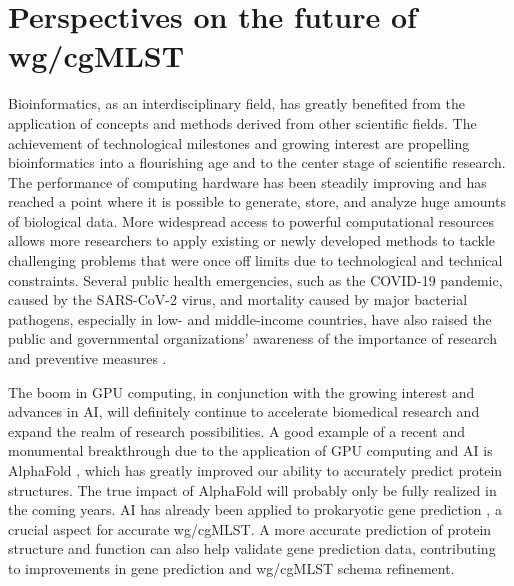 \section{Perspectives on the future of wg/cgMLST}

Bioinformatics, as an interdisciplinary field, has greatly benefited from the application of concepts and methods derived from other scientific fields. The achievement of technological milestones and growing interest are propelling bioinformatics into a flourishing age and to the center stage of scientific research. The performance of computing hardware has been steadily improving and has reached a point where it is possible to generate, store, and analyze huge amounts of biological data. More widespread access to powerful computational resources allows more researchers to apply existing or newly developed methods to tackle challenging problems that were once off limits due to technological and technical constraints. Several public health emergencies, such as the COVID-19 pandemic, caused by the SARS-CoV-2 virus, and mortality caused by major bacterial pathogens, especially in low- and middle-income countries, have also raised the public and governmental organizations' awareness of the importance of research and preventive measures \cite{ikuta_global_2022}.

The boom in \ac{GPU} computing, in conjunction with the growing interest and advances in \ac{AI}, will definitely continue to accelerate biomedical research and expand the realm of research possibilities. A good example of a recent and monumental breakthrough due to the application of \ac{GPU} computing and \ac{AI} is AlphaFold \cite{jumper_highly_2021, abramson_accurate_2024}, which has greatly improved our ability to accurately predict protein structures. The true impact of AlphaFold will probably only be fully realized in the coming years. \ac{AI} has already been applied to prokaryotic gene prediction \cite{sommer_balrog_2021}, a crucial aspect for accurate \ac{wg/cgMLST}. A more accurate prediction of protein structure and function can also help validate gene prediction data, contributing to improvements in gene prediction and \ac{wg/cgMLST} schema refinement.

